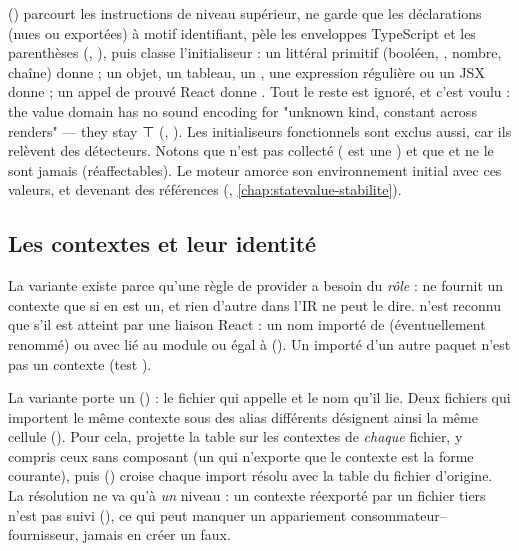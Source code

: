  () parcourt les instructions de niveau supérieur, ne garde que les déclarations  (nues ou exportées) à motif identifiant, pèle les enveloppes TypeScript et les parenthèses (, ), puis classe l'initialiseur : un littéral primitif (booléen, , nombre, chaîne) donne  ; un objet, un tableau, un , une expression régulière ou un JSX donne  ; un appel de  prouvé React donne . Tout le reste est ignoré, et c'est voulu : \og the value domain has no sound encoding for "unknown kind, constant across renders" — they stay ⊤\fg{} (, ). Les initialiseurs fonctionnels sont exclus aussi, car ils relèvent des détecteurs. Notons que  n'est pas collecté ( est une ) et que  et  ne le sont jamais (réaffectables). Le moteur amorce son environnement initial avec ces valeurs,  et  devenant des références  (, \cref{chap:statevalue-stabilite}).

\subsection{Les contextes et leur identité}

La variante  existe parce qu'une règle de provider a besoin du \emph{rôle} :  ne fournit un contexte que si  en est un, et rien d'autre dans l'IR ne peut le dire.  n'est reconnu que s'il est atteint par une liaison React : un nom importé de  (éventuellement renommé) ou  avec  lié au module  ou égal à  (). Un  importé d'un autre paquet n'est pas un contexte (test ).

La variante porte un  () : le fichier qui appelle  et le nom qu'il lie. Deux fichiers qui importent le même contexte sous des alias différents désignent ainsi la même cellule (). Pour cela,  projette la table sur les contextes de \emph{chaque} fichier, y compris ceux sans composant (un  qui n'exporte que le contexte est la forme courante), puis  () croise chaque import résolu avec la table du fichier d'origine. La résolution ne va qu'à \emph{un} niveau : un contexte réexporté par un fichier tiers n'est pas suivi (), ce qui peut manquer un appariement consommateur--fournisseur, jamais en créer un faux.

